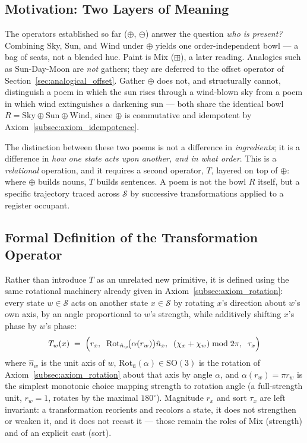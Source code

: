 \documentclass[12pt, a4paper]{article}
\begin{document}
\subsection{Motivation: Two Layers of Meaning}
\label{subsec:transform_motivation}
The operators established so far ($\oplus$, $\ominus$) answer the question
\emph{who is present?} Combining Sky, Sun, and Wind under $\oplus$
yields one order-independent bowl --- a bag of seats, not a blended
hue. Paint is Mix ($\boxplus$), a later reading. Analogies such as Sun-Day-Moon are \emph{not} gathers; they are deferred to the offset operator of Section~\ref{sec:analogical_offset}. Gather $\oplus$ does not, and structurally
cannot, distinguish a poem in which the sun rises through a wind-blown
sky from a poem in which wind extinguishes a darkening sun --- both
share the identical bowl
$R = \text{Sky} \oplus \text{Sun} \oplus \text{Wind}$, since $\oplus$
is commutative and idempotent by Axiom~\ref{subsec:axiom_idempotence}.

The distinction between these two poems is not a difference in
\emph{ingredients}; it is a difference in \emph{how one state acts
upon another, and in what order}. This is a \emph{relational}
operation, and it requires a second operator, $T$, layered on top of
$\oplus$: where $\oplus$ builds nouns, $T$ builds sentences. A poem is
not the bowl $R$ itself, but a specific trajectory traced across
$\mathcal{S}$ by successive transformations applied to a register occupant.

\subsection{Formal Definition of the Transformation Operator}
\label{subsec:transform_definition}
Rather than introduce $T$ as an unrelated new primitive, it is defined
using the same rotational machinery already given in
Axiom~\ref{subsec:axiom_rotation}: every state $w \in \mathcal{S}$
acts on another state $x \in \mathcal{S}$ by rotating $x$'s direction
about $w$'s own axis, by an angle proportional to $w$'s strength, while
additively shifting $x$'s phase by $w$'s phase:
\begin{equation}
    T_w(x)
    \;=\;
    \Bigl(
        r_x,\;\;
        \mathrm{Rot}_{\hat n_w}\!\bigl(\alpha(r_w)\bigr)\hat n_x,\;\;
        (\chi_x + \chi_w) \bmod 2\pi,\;\;
        \tau_x
    \Bigr)
    \label{eq:transform_def}
\end{equation}
where $\hat n_w$ is the unit axis of $w$,
$\mathrm{Rot}_{\hat n}(\alpha) \in \mathrm{SO}(3)$ is the
rotation of Axiom~\ref{subsec:axiom_rotation} about that axis by angle
$\alpha$, and $\alpha(r_w) = \pi r_w$ is the simplest monotonic choice
mapping strength to rotation angle (a full-strength unit, $r_w = 1$,
rotates by the maximal $180^\circ$). Magnitude $r_x$ and sort $\tau_x$ are left invariant:
a transformation reorients and recolors a state, it does not
strengthen or weaken it, and it does not recast it --- those remain
the roles of Mix (strength) and of an explicit cast (sort).
\end{document}
